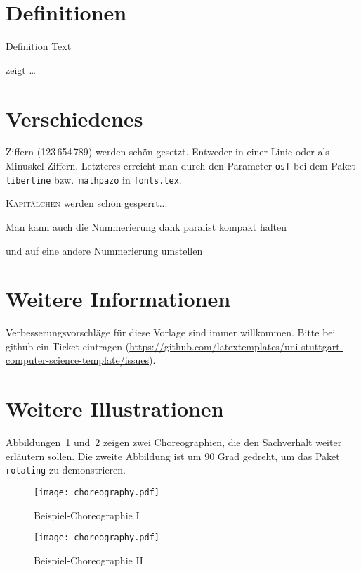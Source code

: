 
\section{Definitionen}
\begin{definition}[Title]
\label{def:def1}
Definition Text
\end{definition}

 zeigt \ldots

\section{Verschiedenes}
\label{sec:diff}
\ifdeutsch
Ziffern (123\,654\,789) werden schön gesetzt.
Entweder in einer Linie oder als Minuskel-Ziffern.
Letzteres erreicht man durch den Parameter \texttt{osf} bei dem Paket \texttt{libertine} bzw.\ \texttt{mathpazo} in \texttt{fonts.tex}.
\fi

\textsc{Kapitälchen} werden schön gesperrt...

\begin{compactenum}[I]
\item Man kann auch die Nummerierung dank paralist kompakt halten
\item und auf eine andere Nummerierung umstellen
\end{compactenum}

\section{Weitere Informationen}
Verbesserungsvorschläge für diese Vorlage sind immer willkommen.
Bitte bei github ein Ticket eintragen (\url{https://github.com/latextemplates/uni-stuttgart-computer-science-template/issues}).
\section{Weitere Illustrationen}
Abbildungen~\ref{fig:AnhangsChor} und~\ref{fig:AnhangsChor2} zeigen zwei Choreographien, die den
Sachverhalt weiter erläutern sollen. Die zweite Abbildung ist um 90 Grad gedreht, um das Paket
\texttt{rotating} zu demonstrieren.

\begin{figure}
  \begin{center}
    \texttt{[image: choreography.pdf]}
    \caption{Beispiel-Choreographie I}
    \label{fig:AnhangsChor}
  \end{center}
\end{figure}

\begin{landscape}
\begin{figure}
  \begin{center}
    \texttt{[image: choreography.pdf]}
    \caption{Beispiel-Choreographie II}
    \label{fig:AnhangsChor2}
  \end{center}
\end{figure}
\end{landscape}
